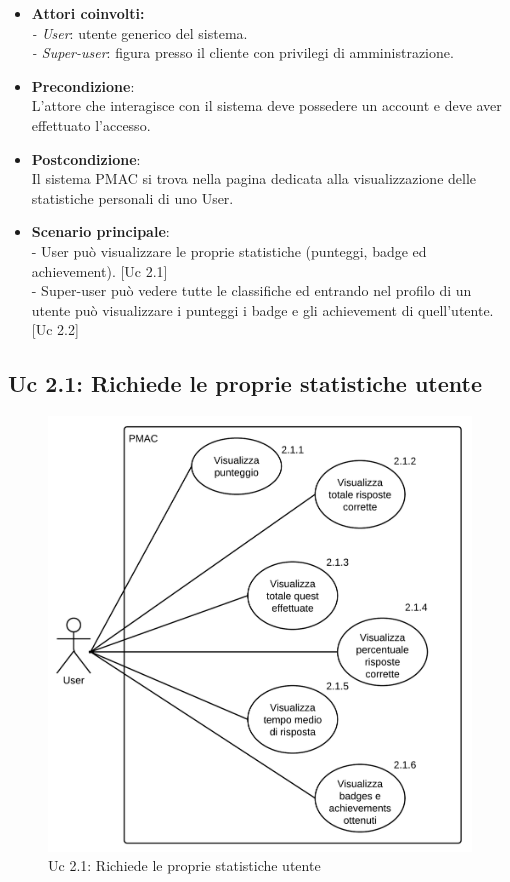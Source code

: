 {\begin{itemize}

\item \textbf{Attori coinvolti:}\\
\emph{- User}: utente generico del sistema.\\
\emph{- Super-user}: figura presso il cliente con privilegi di amministrazione.

\item \textbf{Precondizione}:\\
L'attore che interagisce con il sistema deve possedere un account e deve aver effettuato l'accesso.

\item \textbf{Postcondizione}:\\
Il sistema PMAC si trova nella pagina dedicata alla visualizzazione delle statistiche personali di uno User.

\item \textbf{Scenario principale}:\\
- User può visualizzare le proprie statistiche (punteggi, badge ed achievement). [Uc 2.1]\\
- Super-user può vedere tutte le classifiche ed entrando nel profilo di un utente può visualizzare i punteggi i badge e gli achievement di quell'utente. [Uc 2.2]
\end{itemize}

\newpage

\subsection{Uc 2.1: Richiede le proprie statistiche utente}
\begin{figure}[ht]
\centering
\caption{Uc 2.1: Richiede le proprie statistiche utente}
\includegraphics[scale=0.87]{images/cap1/UseCase/Uc2_1} %
\end{figure}

}
